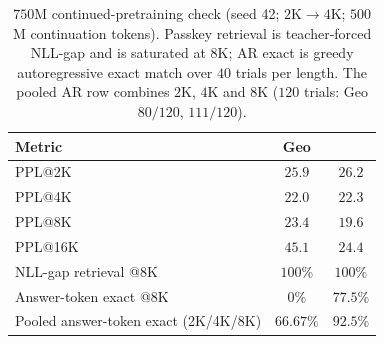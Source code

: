\begin{table}[ht]
\caption{$750$M continued-pretraining check (seed 42; $2$K$\rightarrow4$K;
$500$M continuation tokens). Passkey retrieval is teacher-forced NLL-gap and
is saturated at $8$K; AR exact is greedy autoregressive exact match over $40$
trials per length. The pooled AR row combines $2$K, $4$K and $8$K
($120$ trials: Geo $80/120$, \evq{} $111/120$).}
\label{tab:750m}
\centering
\small
\begin{tabular}{@{}lcc@{}}
\toprule
Metric & Geo & \evq{} \\
\midrule
PPL@2K & $25.9$ & $26.2$ \\
PPL@4K & $22.0$ & $22.3$ \\
PPL@8K & $23.4$ & $\mathbf{19.6}$ \\
PPL@16K & $45.1$ & $\mathbf{24.4}$ \\
\midrule
NLL-gap retrieval @8K & $100\%$ & $100\%$ \\
Answer-token exact @8K & $0\%$ & $\mathbf{77.5\%}$ \\
Pooled answer-token exact (2K/4K/8K) & $66.67\%$ & $\mathbf{92.5\%}$ \\
\bottomrule
\end{tabular}
\end{table}
